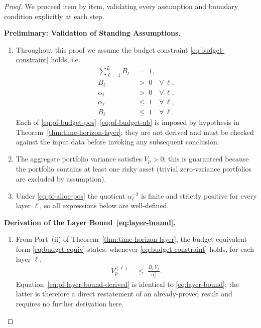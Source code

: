 \documentclass[12pt,openany]{book}
\numberwithin{equation}{chapter}
\theoremstyle{plain}
\theoremstyle{definition}
\theoremstyle{remark}
\begin{document}
\begin{proof}
We proceed item by item, validating every assumption and
boundary condition explicitly at each step.

\medskip
\noindent\textbf{Preliminary: Validation of Standing Assumptions.}
\begin{enumerate}
  \item Throughout this proof we assume the budget constraint
        \eqref{eq:budget-constraint} holds, i.e.\
        \begin{align}
          \sum_{\ell=1}^{L} B_\ell \;&=\; 1,
          \label{eq:pf-budget-sum}\\
          B_\ell \;&>\; 0 \quad \forall\,\ell,
          \label{eq:pf-budget-pos}\\
          \alpha_\ell \;&>\; 0 \quad \forall\,\ell,
          \label{eq:pf-alloc-pos}\\
          \alpha_\ell \;&\leq\; 1 \quad \forall\,\ell,
          \label{eq:pf-alloc-ub}\\
          B_\ell \;&\leq\; 1 \quad \forall\,\ell.
          \label{eq:pf-budget-ub}
        \end{align}
        Each of \eqref{eq:pf-budget-pos}--\eqref{eq:pf-budget-ub}
        is imposed by hypothesis in
        Theorem~\ref{thm:time-horizon-layer}; they are not
        derived and must be checked against the input data
        before invoking any subsequent conclusion.

  \item The aggregate portfolio variance satisfies
        $V_p > 0$; this is guaranteed because the portfolio
        contains at least one risky asset (trivial zero-variance
        portfolios are excluded by assumption).

  \item Under \eqref{eq:pf-alloc-pos} the quotient
        $\alpha_\ell^{-2}$ is finite and strictly positive for
        every layer $\ell$, so all expressions below are
        well-defined.
\end{enumerate}

\medskip
\noindent\textbf{Derivation of the Layer Bound~\eqref{eq:layer-bound}.}
\begin{enumerate}
  \item From Part~(ii) of Theorem~\ref{thm:time-horizon-layer},
        the budget-equivalent form \eqref{eq:budget-equiv} states:
        whenever \eqref{eq:budget-constraint} holds, for each
        layer $\ell$,
        \begin{align}
          V_p^{(\ell)}
          \;&\leq\;
          \frac{B_\ell\,V_p}{\alpha_\ell^2}.
          \label{eq:pf-layer-bound-derived}
        \end{align}
        Equation~\eqref{eq:pf-layer-bound-derived} is identical
        to \eqref{eq:layer-bound}; the latter is therefore a
        direct restatement of an already-proved result and
        requires no further derivation here.


\end{enumerate}
\end{proof}
\end{document}
